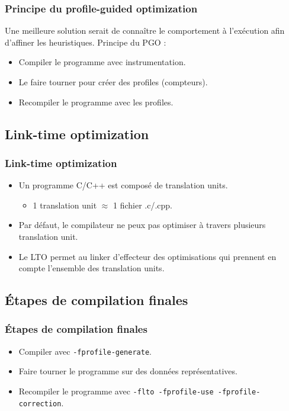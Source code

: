 \documentclass{beamer}
\begin{document}
\begin{frame}
    \frametitle{Principe du profile-guided optimization}

    Une meilleure solution serait de connaître le comportement à l'exécution afin d'affiner les heuristiques.
    Principe du PGO :
    \begin{itemize}
        \item Compiler le programme avec instrumentation.
        \item Le faire tourner pour créer des profiles (compteurs).
        \item Recompiler le programme avec les profiles.
    \end{itemize}
\end{frame}

\subsection{Link-time optimization}

\begin{frame}
    \frametitle{Link-time optimization}

    \begin{itemize}
        \item Un programme C/C++ est composé de translation units.
              \begin{itemize}
                  \item 1 translation unit $ \approx $ 1 fichier .c/.cpp.
              \end{itemize}
        \item Par défaut, le compilateur ne peux pas optimiser à travers plusieurs translation unit.
        \item Le LTO permet au linker d'effecteur des optimisations qui prennent en compte l'ensemble des translation units.
    \end{itemize}
\end{frame}

\subsection{Étapes de compilation finales}

\begin{frame}[fragile]
    \frametitle{Étapes de compilation finales}

    \begin{itemize}
        \item Compiler avec \verb'-fprofile-generate'.
        \item Faire tourner le programme sur des données représentatives.
        \item Recompiler le programme avec \verb'-flto -fprofile-use -fprofile-correction'.
    \end{itemize}
\end{frame}
\end{document}
